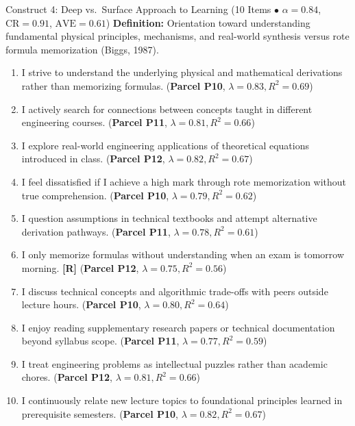 \documentclass[10pt,a4paper]{article}
\begin{document}
\vspace{0.2cm}
\begin{constructbox}{Construct 4: Deep vs.\ Surface Approach to Learning (10 Items $\bullet$ $\alpha = 0.84$, $\text{CR} = 0.91$, $\text{AVE} = 0.61$)}
\textbf{Definition:} Orientation toward understanding fundamental physical principles, mechanisms, and real-world synthesis versus rote formula memorization (Biggs, 1987).
\begin{enumerate}[label=\textbf{Q\arabic*.}, leftmargin=2.5em, itemsep=2pt, resume]
  \item I strive to understand the underlying physical and mathematical derivations rather than memorizing formulas. \hfill (\textbf{Parcel P10}, $\lambda = 0.83, R^2 = 0.69$)
  \item I actively search for connections between concepts taught in different engineering courses. \hfill (\textbf{Parcel P11}, $\lambda = 0.81, R^2 = 0.66$)
  \item I explore real-world engineering applications of theoretical equations introduced in class. \hfill (\textbf{Parcel P12}, $\lambda = 0.82, R^2 = 0.67$)
  \item I feel dissatisfied if I achieve a high mark through rote memorization without true comprehension. \hfill (\textbf{Parcel P10}, $\lambda = 0.79, R^2 = 0.62$)
  \item I question assumptions in technical textbooks and attempt alternative derivation pathways. \hfill (\textbf{Parcel P11}, $\lambda = 0.78, R^2 = 0.61$)
  \item I only memorize formulas without understanding when an exam is tomorrow morning. \textbf{[R]} \hfill (\textbf{Parcel P12}, $\lambda = 0.75, R^2 = 0.56$)
  \item I discuss technical concepts and algorithmic trade-offs with peers outside lecture hours. \hfill (\textbf{Parcel P10}, $\lambda = 0.80, R^2 = 0.64$)
  \item I enjoy reading supplementary research papers or technical documentation beyond syllabus scope. \hfill (\textbf{Parcel P11}, $\lambda = 0.77, R^2 = 0.59$)
  \item I treat engineering problems as intellectual puzzles rather than academic chores. \hfill (\textbf{Parcel P12}, $\lambda = 0.81, R^2 = 0.66$)
  \item I continuously relate new lecture topics to foundational principles learned in prerequisite semesters. \hfill (\textbf{Parcel P10}, $\lambda = 0.82, R^2 = 0.67$)
\end{enumerate}
\end{constructbox}
\end{document}
